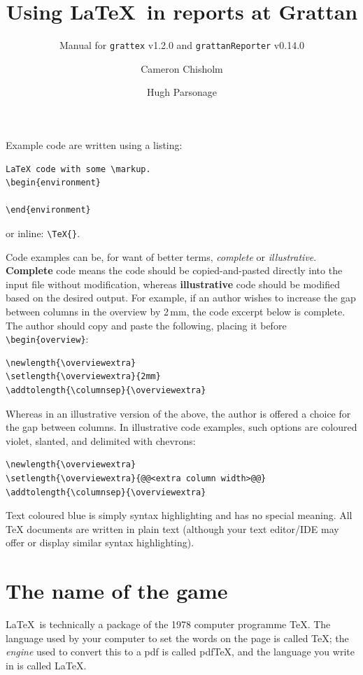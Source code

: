 \documentclass[a4paper,11pt]{scrreprt}\usepackage[]{graphicx}\usepackage[]{color}
\title{{\textrm{Using \LaTeX\ in reports at Grattan}}}
\subtitle{Manual for \texttt{grattex} v1.2.0 and \texttt{grattanReporter} v0.14.0}
\author{Cameron Chisholm \and Hugh Parsonage}
\let\oldLaTeX\LaTeX
\renewcommand{\LaTeX}{\textrm{\oldLaTeX}}
\newcommand{\defi}[1]{\textbf{\textsf{#1}}}
\begin{document}
\maketitle
\tableofcontents
\newpage 
Example code are written using a listing:
\begin{lstlisting}
LaTeX code with some \markup.  
\begin{environment}

\end{environment}
\end{lstlisting}
or inline: \lstinline!\TeX{}!.

Code examples can be, for want of better terms, \emph{complete} or \emph{illustrative}. \defi{Complete} code means the code should be copied-and-pasted directly into the input file without modification, whereas \defi{illustrative} code should be modified based on the desired output. For example, if an author wishes to increase the gap between columns in the overview by 2\,mm, the code excerpt below is complete. The author should copy and paste the following, placing it before \lstinline!\begin{overview}!:
\begin{lstlisting}
\newlength{\overviewextra}
\setlength{\overviewextra}{2mm}
\addtolength{\columnsep}{\overviewextra}
\end{lstlisting}
Whereas in an illustrative version of the above, the author is offered a choice for the gap between columns. In illustrative code examples, such options are coloured violet, slanted, and delimited with chevrons:
\begin{lstlisting}
\newlength{\overviewextra}
\setlength{\overviewextra}{@@<extra column width>@@}
\addtolength{\columnsep}{\overviewextra}
\end{lstlisting}


Text coloured blue is simply syntax highlighting and has no special meaning. All \TeX{} documents are written in plain text (although your text editor/\textsc{IDE} may offer or display similar syntax highlighting). 

\newpage
\chapter{The name of the game}
\LaTeX\ is technically a package of the 1978 computer programme \TeX. 
The language used by your computer to set the words on the page is called \TeX; the \emph{engine} used to convert this to a pdf is called pdf\TeX, and the language you write in is called \LaTeX. 
\end{document}
